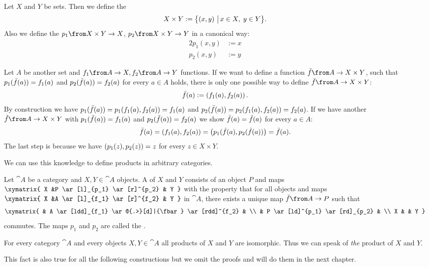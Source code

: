 \begin{example}
  \label{ex:prod:cart}
  Let $X$ and $Y$ be sets.
  Then we define the 
  $$X \times Y := \bigl \{ \left( x , y \right) \,\big|\, x \in X, \; y \in Y \bigr \}.$$
  Also we define the  $p_1 \from X \times Y \to X$, $p_2 \from X \times Y \to Y$ in a canonical way:
  \begin{alignat*}{2}
    p_1(x,y) &:= x \\
    p_2(x,y) &:= y
  \end{alignat*}

  Let $A$ be another set and $f_1 \from A \to X, f_2 \from A \to Y$ functions.
  If we want to define a function $\fbar \from A \to X \times Y$, such that
  $p_1(\bar{f}(a)) = f_1(a)$ and $p_2(\bar{f}(a)) = f_2(a)$ for every $a \in A$ holds,
  there is only one possible way to define $\fbar \from A \to X \times Y$:
  $$\bar{f}(a) := \left( f_1(a) , f_2(a) \right).$$
  By construction we have $p_1(\bar{f}(a)) = p_1(f_1(a), f_2(a)) = f_1(a)$ and $p_2(\bar{f}(a)) = p_2(f_1(a), f_2(a)) = f_2(a)$.
  If we have another $\ftilde \from A \to X \times Y$ with $p_1(\tilde{f}(a)) = f_1(a)$ and $p_2(\tilde{f}(a)) = f_2(a)$ we show $\bar{f}(a) = \tilde{f}(a)$ for every $a \in A$:
  $$\bar{f}(a) = \left( f_1(a) , f_2(a) \right) = \left( p_1(\tilde{f}(a) , p_2(\tilde{f}(a)) \right) = \tilde{f}(a).$$
  The last step is because we have $\left( p_1(z) , p_2(z) \right) = z$ for every $z \in X \times Y$.
\end{example}

We can use this knowledge to define products in arbitrary categories.

\begin{definition}[Product]
  \label{def:prod}
  Let $\cat{A}$ be a category and $X, Y \in \cat{A}$ objects.
  A  of $X$ and $Y$ consists of an object $P$ and maps
  $ \xymatrix{
    X &P \ar[l]_{p_1} \ar[r]^{p_2} & Y
  } $
  with the property that for all objects and maps
  $ \xymatrix{
    X &A \ar[l]_{f_1} \ar[r]^{f_2} & Y
  } $
  in $\cat{A}$, there exists a unique map $\fbar\from A \to P$ such that
  \[ \xymatrix{
    & A \ar[ldd]_{f_1} \ar@{.>}[d]|{\fbar} \ar[rdd]^{f_2} & \\
    & P \ar[ld]^{p_1} \ar[rd]_{p_2} & \\
    X & & Y
  } \]
  commutes. The maps $p_1$ and $p_2$ are called the .
\end{definition}

\begin{lemma}
  \label{lem:prod:uniq}
  For every category $\cat{A}$ and every objects $X, Y \in \cat{A}$
  all products of $X$ and $Y$ are isomorphic. Thus we can speak of \emph{the} product of $X$ and $Y$.

  This fact is also true for all the following constructions but we omit the proofs and will do them in the next chapter.
\end{lemma}

